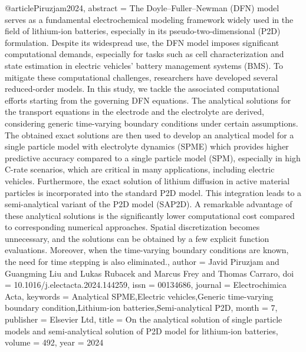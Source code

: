@article{Piruzjam2024,
   abstract = {The Doyle–Fuller–Newman (DFN) model serves as a fundamental electrochemical modeling framework widely used in the field of lithium-ion batteries, especially in its pseudo-two-dimensional (P2D) formulation. Despite its widespread use, the DFN model imposes significant computational demands, especially for tasks such as cell characterization and state estimation in electric vehicles’ battery management systems (BMS). To mitigate these computational challenges, researchers have developed several reduced-order models. In this study, we tackle the associated computational efforts starting from the governing DFN equations. The analytical solutions for the transport equations in the electrode and the electrolyte are derived, considering generic time-varying boundary conditions under certain assumptions. The obtained exact solutions are then used to develop an analytical model for a single particle model with electrolyte dynamics (SPME) which provides higher predictive accuracy compared to a single particle model (SPM), especially in high C-rate scenarios, which are critical in many applications, including electric vehicles. Furthermore, the exact solution of lithium diffusion in active material particles is incorporated into the standard P2D model. This integration leads to a semi-analytical variant of the P2D model (SAP2D). A remarkable advantage of these analytical solutions is the significantly lower computational cost compared to corresponding numerical approaches. Spatial discretization becomes unnecessary, and the solutions can be obtained by a few explicit function evaluations. Moreover, when the time-varying boundary conditions are known, the need for time stepping is also eliminated.},
   author = {Javid Piruzjam and Guangming Liu and Lukas Rubacek and Marcus Frey and Thomas Carraro},
   doi = {10.1016/j.electacta.2024.144259},
   issn = {00134686},
   journal = {Electrochimica Acta},
   keywords = {Analytical SPME,Electric vehicles,Generic time-varying boundary condition,Lithium-ion batteries,Semi-analytical P2D},
   month = {7},
   publisher = {Elsevier Ltd},
   title = {On the analytical solution of single particle models and semi-analytical solution of P2D model for lithium-ion batteries},
   volume = {492},
   year = {2024}
}
